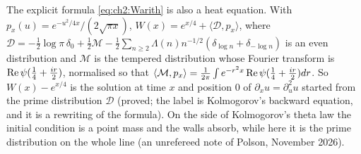 The explicit formula \eqref{eq:ch2:Warith} is also a heat equation. With $p_x(u)=e^{-u^2/4x}/(2\sqrt{\pi x})$, $W(x)=e^{x/4}+\langle\mathcal D,p_x\rangle$, where $\mathcal D=-\frac12\log\pi\,\delta_0+\frac12\mathcal M-\frac12\sum_{n\ge2}\Lambda(n)n^{-1/2}(\delta_{\log n}+\delta_{-\log n})$ is an even distribution and $\mathcal M$ is the tempered distribution whose Fourier transform is $\operatorname{Re}\psi(\frac14+\frac{ir}2)$, normalised so that $\langle\mathcal M,p_x\rangle=\frac1{2\pi}\int e^{-r^2x}\operatorname{Re}\psi(\frac14+\frac{ir}2)dr$. So $W(x)-e^{x/4}$ is the solution at time $x$ and position $0$ of $\partial_xu=\partial_u^2u$ started from the prime distribution $\mathcal D$ (proved; the label is Kolmogorov's backward equation, and it is a rewriting of the formula). On the side of Kolmogorov's theta law the initial condition is a point mass and the walls absorb, while here it is the prime distribution on the whole line (an unrefereed note of Polson, November 2026).

